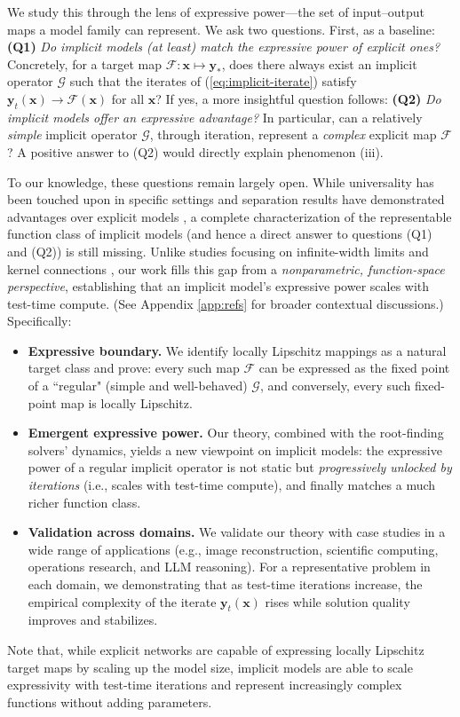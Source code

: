 \documentclass{amsart} %
\def\eqref#1{equation~\ref{#1}}
\def\vx{{\bm{x}}}
\def\vy{{\bm{y}}}
\def\cF{{\mathcal{F}}}
\def\cG{{\mathcal{G}}}
\theoremstyle{definition}
\theoremstyle{remark}
\renewcommand{\eqref}[1]{\textup{(\ref{#1})}}
\begin{document}
We study this through the lens of {expressive power}—the set of input–output maps a model family can represent. We ask two questions. First, as a baseline:
\textbf{(Q1)} \textit{Do implicit models (at least) match the expressive power of explicit ones?} Concretely, for a target map \(\cF:\vx\mapsto \vy_\ast\), does there always exist an implicit operator \(\cG\) such that the iterates of \eqref{eq:implicit-iterate} satisfy $\vy_t(\vx) \to \cF(\vx)$ for all $\vx$? 
If yes, a more insightful question follows:
\textbf{(Q2)} \textit{Do implicit models offer an expressive advantage?} In particular, can a relatively \textit{simple} implicit operator $\cG$, through iteration, represent a \textit{complex} explicit map $\cF$? A positive answer to (Q2) would directly explain phenomenon (iii).


To our knowledge, these questions remain largely open. While universality has been touched upon in specific settings \cite{bai2019deep,marwah2023deep} and separation results have demonstrated advantages over explicit models \cite{wu2024separation}, a complete characterization of the representable function class of implicit models (and hence a direct answer to questions (Q1) and (Q2)) is still missing.
Unlike studies focusing on infinite-width limits and kernel connections \cite{gao2022a,feng2023neural,ling2024deep}, our work fills this gap from a \textit{nonparametric, function-space perspective}, establishing that an implicit model's expressive power scales with test-time compute. (See Appendix \ref{app:refs} for broader contextual discussions.)
Specifically: 
\begin{itemize}[leftmargin=5mm]
\item \textbf{Expressive boundary.} We identify locally Lipschitz mappings as a natural target class and prove: every such map $\cF$ can be expressed as the fixed point of a ``regular" (simple and well-behaved) $\cG$, and conversely, every such fixed-point map is locally Lipschitz.
\item \textbf{Emergent expressive power.} Our theory, combined with the root-finding solvers' dynamics, yields a new viewpoint on implicit models: the expressive power of a regular implicit operator is not static but \textit{progressively unlocked by iterations} (i.e., scales with test-time compute), and finally matches a much richer function class.
\item \textbf{Validation across domains.} We validate our theory with case studies in a wide range of applications (e.g., image reconstruction, scientific computing, operations research, and LLM reasoning). For a representative problem in each domain, we demonstrating that as test-time iterations increase, the empirical complexity of the iterate $\vy_t(\vx)$ rises while solution quality improves and stabilizes.
\end{itemize}
Note that, while explicit networks are capable of expressing locally Lipschitz target maps \cite{beneventano2021deep} by scaling up the model size, implicit models are able to scale expressivity with test-time iterations and represent increasingly complex functions without adding parameters.
\end{document}
